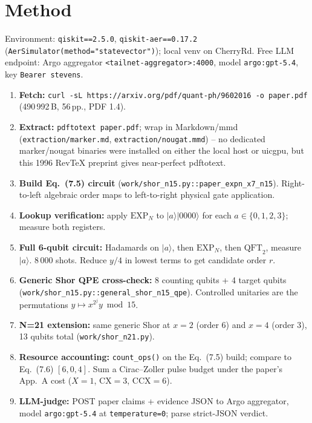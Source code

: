 \documentclass[11pt]{article}
\begin{document}
\section{Method}

Environment: \texttt{qiskit==2.5.0}, \texttt{qiskit-aer==0.17.2}
(\texttt{AerSimulator(method="statevector")}); local venv on CherryRd.
Free LLM endpoint: Argo aggregator \texttt{<tailnet-aggregator>:4000},
model \texttt{argo:gpt-5.4}, key \texttt{Bearer stevens}.

\begin{enumerate}
  \item \textbf{Fetch:} \texttt{curl -sL https://arxiv.org/pdf/quant-ph/9602016 -o paper.pdf}
        (490\,992\,B, 56\,pp., PDF 1.4).
  \item \textbf{Extract:} \texttt{pdftotext paper.pdf}; wrap in Markdown/mmd
        (\texttt{extraction/marker.md}, \texttt{extraction/nougat.mmd}) --
        no dedicated marker/nougat binaries were installed on either
        the local host or uicgpu, but this 1996 RevTeX preprint gives
        near-perfect pdftotext.
  \item \textbf{Build Eq.~(7.5) circuit} (\texttt{work/shor\_n15.py::paper\_expn\_x7\_n15}).
        Right-to-left algebraic order maps to left-to-right physical
        gate application.
  \item \textbf{Lookup verification:} apply \(\mathrm{EXP}_N\) to
        \(|a\rangle|0000\rangle\) for each \(a\in\{0,1,2,3\}\); measure
        both registers.
  \item \textbf{Full 6-qubit circuit:} Hadamards on \(|a\rangle\), then
        \(\mathrm{EXP}_N\), then \(\mathrm{QFT}_2\), measure \(|a\rangle\).
        8\,000 shots.  Reduce \(y/4\) in lowest terms to get
        candidate order \(r\).
  \item \textbf{Generic Shor QPE cross-check:} 8 counting qubits +
        4 target qubits (\texttt{work/shor\_n15.py::general\_shor\_n15\_qpe}).
        Controlled unitaries are the permutations
        \(y\mapsto x^{2^{j}} y\bmod 15\).
  \item \textbf{N=21 extension:} same generic Shor at \(x=2\) (order 6)
        and \(x=4\) (order 3), 13 qubits total
        (\texttt{work/shor\_n21.py}).
  \item \textbf{Resource accounting:} \texttt{count\_ops()} on the
        Eq.~(7.5) build; compare to Eq.~(7.6) \([6,0,4]\).  Sum a
        Cirac--Zoller pulse budget under the paper's App.~A cost
        (\(X{=}1\), \(\mathrm{CX}{=}3\), \(\mathrm{CCX}{=}6\)).
  \item \textbf{LLM-judge:} POST paper claims + evidence JSON to
        Argo aggregator, model \texttt{argo:gpt-5.4} at
        \texttt{temperature=0}; parse strict-JSON verdict.
\end{enumerate}
\end{document}
